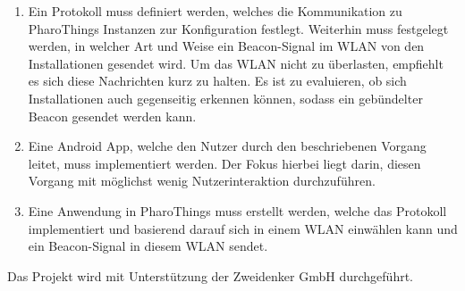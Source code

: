 \documentclass[12pt,a4paper]{article}
\begin{document}
        \begin{enumerate}
            \item Ein Protokoll muss definiert werden, welches die Kommunikation zu PharoThings Instanzen zur Konfiguration festlegt.
            Weiterhin muss festgelegt werden, in welcher Art und Weise ein Beacon-Signal im WLAN von den Installationen gesendet wird.
            Um das WLAN nicht zu überlasten, empfiehlt es sich diese Nachrichten kurz zu halten. Es ist zu evaluieren,
            ob sich Installationen auch gegenseitig erkennen können, sodass ein gebündelter Beacon gesendet werden kann.
            \item Eine Android App, welche den Nutzer durch den beschriebenen Vorgang leitet, muss implementiert werden.
            Der Fokus hierbei liegt darin, diesen Vorgang mit möglichst wenig Nutzerinteraktion durchzuführen.
            \item Eine Anwendung in PharoThings muss erstellt werden, welche das Protokoll implementiert
            und basierend darauf sich in einem WLAN einwählen kann und ein Beacon-Signal in diesem WLAN sendet.
        \end{enumerate}
        Das Projekt wird mit Unterstützung der Zweidenker GmbH durchgeführt.
    \pagebreak
\end{document}
